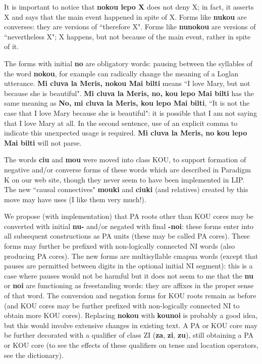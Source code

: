 \documentclass[12pt]{book}
\begin{document}
It is important to notice that {\bf nokou lepo X} does not deny X; in fact, it asserts X and says that the main event happened in spite of X.   Forms like {\bf nukou} are converses:  they are versions of ``therefore X".  Forms like {\bf nunokou} are versions of ``nevertheless X"; X happens, but not because of the main event, rather in spite of it.

The forms with initial {\bf no} are obligatory words:  pausing between the syllables of the word {\bf nokou}, for example can radically change the meaning of a Loglan utterance.
{\bf Mi cluva la Meris, nokou Mai bilti} means ``I love Mary, but not because she is beautiful".  {\bf Mi cluva la Meris, no, kou lepo Mai bilti} has the same meaning as {\bf No, mi cluva la Meris, kou lepo Mai bilti}, ``It is not the case that I love Mary because she is beautiful":  it is possible that I am not saying that I love Mary at all.  In the second sentence, use of an explicit comma to indicate this unexpected usage is required.  {\bf Mi cluva la Meris, no kou lepo Mai bilti}  will not parse.

The words {\bf ciu} and {\bf mou} were moved into class KOU, to support formation of negative and/or converse forms of these words which are described in Paradigm K on our web site, though they never seem to have been implemented in LIP.  The new ``causal connectives" {\bf mouki} and {\bf ciuki} (and relatives) created by this move may have uses (I like them very much!).

We propose (with implementation) that PA roots other than KOU cores may be converted with initial {\bf nu-} and/or negated with final {\bf -noi}:  these forms enter into all subsequent constructions as PA units (these may be called PA cores). These forms may further be prefixed with non-logically connected NI words (also producing PA cores).  The new forms are multisyllable cmapua words (except that pauses are permitted between digits in the optional initial NI segment):  this is a case where pauses would not be harmful but it does not seem to me that the {\bf nu} or {\bf noi} are functioning as freestanding words:  they are affixes in the proper sense of that word.  The conversion and negation forms for KOU roots remain as before (and KOU cores may be further prefixed with non-logically connected NI to obtain more KOU cores).   Replacing {\bf nokou} with {\bf kounoi} is probably a good idea, but this would involve extensive changes in existing text.  A PA or KOU core may be further decorated with a qualifier of class ZI ({\bf za}, {\bf zi}, {\bf zu}), still obtaining a PA or KOU core (to see the effects of these qualifiers on tense and location operators, see the dictionary). 
\end{document}
